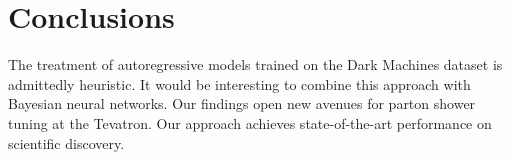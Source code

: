 \section{Conclusions}\label{sec:conclusions}

The treatment of autoregressive models trained on the Dark Machines
dataset is admittedly heuristic. It would be interesting to combine this
approach with Bayesian neural networks. Our findings open new avenues
for parton shower tuning at the Tevatron. Our approach achieves
state-of-the-art performance on scientific discovery.


